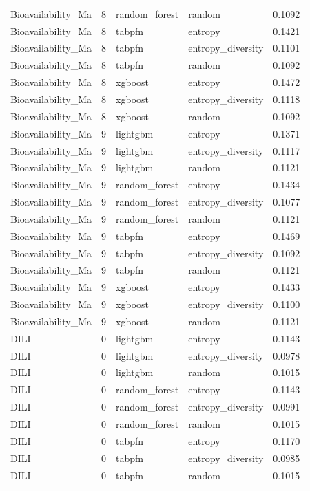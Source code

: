 \begin{tabular}{lrllr}
Bioavailability_Ma & 8 & random_forest & random & 0.1092 \\
Bioavailability_Ma & 8 & tabpfn & entropy & 0.1421 \\
Bioavailability_Ma & 8 & tabpfn & entropy_diversity & 0.1101 \\
Bioavailability_Ma & 8 & tabpfn & random & 0.1092 \\
Bioavailability_Ma & 8 & xgboost & entropy & 0.1472 \\
Bioavailability_Ma & 8 & xgboost & entropy_diversity & 0.1118 \\
Bioavailability_Ma & 8 & xgboost & random & 0.1092 \\
Bioavailability_Ma & 9 & lightgbm & entropy & 0.1371 \\
Bioavailability_Ma & 9 & lightgbm & entropy_diversity & 0.1117 \\
Bioavailability_Ma & 9 & lightgbm & random & 0.1121 \\
Bioavailability_Ma & 9 & random_forest & entropy & 0.1434 \\
Bioavailability_Ma & 9 & random_forest & entropy_diversity & 0.1077 \\
Bioavailability_Ma & 9 & random_forest & random & 0.1121 \\
Bioavailability_Ma & 9 & tabpfn & entropy & 0.1469 \\
Bioavailability_Ma & 9 & tabpfn & entropy_diversity & 0.1092 \\
Bioavailability_Ma & 9 & tabpfn & random & 0.1121 \\
Bioavailability_Ma & 9 & xgboost & entropy & 0.1433 \\
Bioavailability_Ma & 9 & xgboost & entropy_diversity & 0.1100 \\
Bioavailability_Ma & 9 & xgboost & random & 0.1121 \\
DILI & 0 & lightgbm & entropy & 0.1143 \\
DILI & 0 & lightgbm & entropy_diversity & 0.0978 \\
DILI & 0 & lightgbm & random & 0.1015 \\
DILI & 0 & random_forest & entropy & 0.1143 \\
DILI & 0 & random_forest & entropy_diversity & 0.0991 \\
DILI & 0 & random_forest & random & 0.1015 \\
DILI & 0 & tabpfn & entropy & 0.1170 \\
DILI & 0 & tabpfn & entropy_diversity & 0.0985 \\
DILI & 0 & tabpfn & random & 0.1015 \\

\end{tabular}
